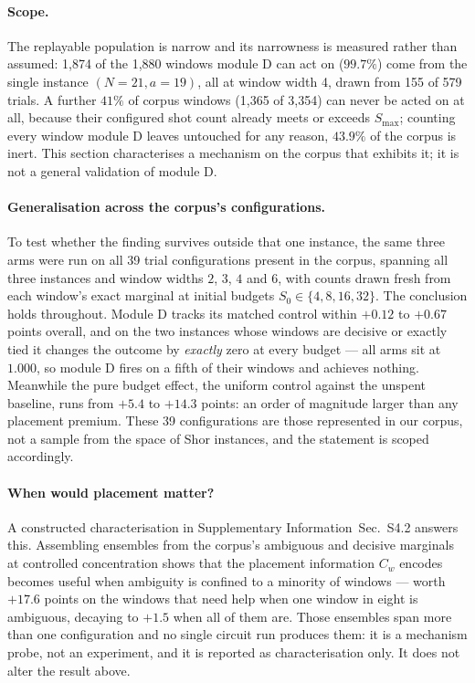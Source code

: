 \documentclass[final,5p,times,longtitle]{elsarticle}
\newcommand{\SI}{Supplementary Information}
\newcommand{\SIfamilyB}{\SI{}~Sec.~S4.2}
\newcommand{\Cw}{C_w}
\newcommand{\Smax}{S_{\max}}
\begin{document}
\paragraph{Scope.} The replayable population is narrow and its narrowness
is measured rather than assumed: 1{,}874 of the 1{,}880 windows module D
can act on ($99.7\%$) come from the single instance $(N{=}21, a{=}19)$, all
at window width 4, drawn from 155 of 579 trials. A further $41\%$ of corpus
windows (1{,}365 of 3{,}354) can never be acted on at all, because their
configured shot count already meets or exceeds $\Smax$; counting every
window module D leaves untouched for any reason, $43.9\%$ of the corpus is
inert. This section characterises a mechanism on the corpus that
exhibits it; it is not a general validation of module D.

\paragraph{Generalisation across the corpus's configurations.} To test
whether the finding survives outside that one instance, the same three arms
were run on all 39 trial configurations present in the corpus, spanning all
three instances and window widths $2$, $3$, $4$ and $6$, with counts drawn
fresh from each window's exact marginal at initial budgets
$S_0\in\{4,8,16,32\}$. The conclusion holds throughout. Module D tracks its
matched control within $+0.12$ to $+0.67$ points overall, and on the two
instances whose windows are decisive or exactly tied it changes the outcome
by \emph{exactly} zero at every budget --- all arms sit at $1.000$, so
module D fires on a fifth of their windows and achieves nothing. Meanwhile
the pure budget effect, the uniform control against the unspent baseline,
runs from $+5.4$ to $+14.3$ points: an order of magnitude larger than any
placement premium. These 39 configurations are those represented in our
corpus, not a sample from the space of Shor instances, and the statement is
scoped accordingly.

\paragraph{When would placement matter?} A constructed characterisation in
\SIfamilyB{} answers this. Assembling ensembles from the corpus's
ambiguous and decisive marginals at controlled concentration shows that the
placement information $\Cw$ encodes becomes useful when ambiguity is
confined to a minority of windows --- worth $+17.6$ points on the windows
that need help when one window in eight is ambiguous, decaying to $+1.5$
when all of them are. Those ensembles span more than one configuration and
no single circuit run produces them: it is a mechanism probe, not an experiment, and it is
reported as characterisation only. It does not alter the result above.
\end{document}
